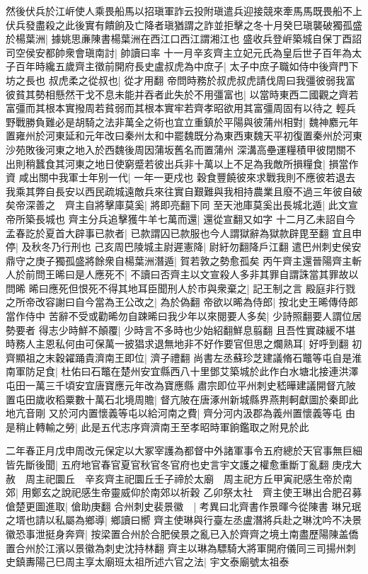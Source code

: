 然後伏兵於江㟁使人乘畏船馬以招瑱軍詐云投附瑱遣兵迎接競來牽馬馬既畏船不上伏兵發盡殺之此後實有饋餉及亡降者瑱猶謂之詐並拒擊之冬十月癸巳瑱襲破獨孤盛於楊葉洲|{
	據姚思亷陳書楊葉洲在西江口西江謂湘江也}
盛收兵登㟁築城自保丁酉詔司空侯安都帥衆會瑱南討|{
	帥讀曰率}
十一月辛亥齊主立妃元氏為皇后世子百年為太子百年時纔五歲齊主徵前開府長史盧叔虎為中庶子|{
	太子中庶子職如侍中後齊門下坊之長也}
叔虎柔之從叔也|{
	從才用翻}
帝問時務於叔虎叔虎請伐周曰我彊彼弱我富彼貧其勢相懸然干戈不息未能并吞者此失於不用彊富也|{
	以當時東西二國觀之齊若富彊而其根本實撥周若貧弱而其根本實牢若齊孝昭欲用其富彊周固有以待之}
輕兵野戰勝負難必是胡騎之法非萬全之術也宜立重鎮於平陽與彼蒲州相對|{
	魏神䴥元年置雍州於河東延和元年改曰秦州太和中罷魏既分為東西東魏天平初復置秦州於河東沙苑敗後河東之地入於西魏後周因蒲坂舊名而置蒲州}
深溝高壘運糧積甲彼閉關不出則稍蠶食其河東之地日使窮蹙若彼出兵非十萬以上不足為我敵所損糧食|{
	損當作資}
咸出關中我軍士年别一代|{
	一年一更戍也}
穀食豐饒彼來求戰我則不應彼若退去我乘其弊自長安以西民疏城遠敵兵來往實自艱難與我相持農業且廢不過三年彼自破矣帝深善之　齊主自將擊庫莫奚|{
	將即亮翻下同}
至天池庫莫奚出長城北遁|{
	此文宣帝所築長城也}
齊主分兵追擊獲牛羊七萬而還|{
	還從宣翻又如字}
十二月乙未詔自今孟春訖於夏首大辟事已款者|{
	已款謂囚已款服也今人謂獄辭為獄款辟毘至翻}
宜且申停|{
	及秋冬乃行刑也}
己亥周巴陵城主尉遲憲降|{
	尉紆勿翻降戶江翻}
遣巴州刺史侯安鼎守之庚子獨孤盛將餘衆自楊葉洲潛遁|{
	賀若敦之勢愈孤矣}
丙午齊主還晉陽齊主斬人於前問王晞曰是人應死不|{
	不讀曰否齊主以文宣殺人多非其罪自謂誅當其罪故以問晞}
晞曰應死但恨死不得其地耳臣聞刑人於市與衆棄之|{
	記王制之言}
殿庭非行戮之所帝改容謝曰自今當為王公改之|{
	為於偽翻}
帝欲以晞為侍郎|{
	按北史王晞傳侍郎當作侍中}
苦辭不受或勸晞勿自踈晞曰我少年以來閱要人多矣|{
	少詩照翻要人謂位居勢要者}
得志少時鮮不顛覆|{
	少時言不多時也少始紹翻鮮息翦翻}
且吾性實疎緩不堪時務人主恩私何由可保萬一披猖求退無地非不好作要官但思之爛熟耳|{
	好呼到翻}
初齊顯祖之末穀糴踊貴濟南王即位|{
	濟子禮翻}
尚書左丞蘇珍芝建議脩石鼈等屯自是淮南軍防足食|{
	杜佑曰石鼈在楚州安宜縣西八十里鄧艾築城於此作白水塘北接連洪澤屯田一萬三千頃安宜唐寶應元年改為寶應縣}
肅宗即位平州刺史嵇曄建議開督亢陂置屯田歲收稻粟數十萬石北境周贍|{
	督亢陂在唐涿州新城縣界燕荆軻獻圖於秦即此地亢音剛}
又於河内置懷義等屯以給河南之費|{
	齊分河内汲郡為義州置懷義等屯}
由是稍止轉輸之勞|{
	此是五代志序齊濟南王至孝昭時軍餉鑑取之附見於此}


二年春正月戊申周改元保定以大冢宰護為都督中外諸軍事令五府總於天官事無巨細皆先斷後聞|{
	五府地官春官夏官秋官冬官府也史言宇文護之權愈重斷丁亂翻}
庚戌大赦　周主祀圜丘　辛亥齊主祀圜丘壬子禘於太廟　周主祀方丘甲寅祀感生帝於南郊|{
	用鄭玄之說祀感生帝靈威仰於南郊以祈穀}
乙卯祭太社　齊主使王琳出合肥召募傖楚更圖進取|{
	傖助庚翻}
合州刺史裴景徽　|{
	考異曰北齊書作景暉今從陳書}
琳兄珉之壻也請以私屬為鄉導|{
	鄉讀曰嚮}
齊主使琳與行臺左丞盧潛將兵赴之琳沈吟不决景徽恐事泄挺身奔齊|{
	按梁置合州於合肥侯景之亂已入於齊齊之境土南盡歷陽陳盖僑置合州於江濱以景徽為刺史沈持林翻}
齊主以琳為驃騎大將軍開府儀同三司揚州刺史鎮夀陽己巳周主享太廟班太祖所述六官之法|{
	宇文泰廟號太祖泰}


